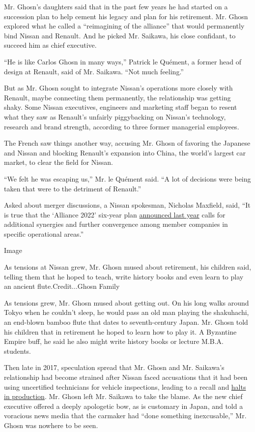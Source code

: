 Mr. Ghosn's daughters said that in the past few years he had started on
a succession plan to help cement his legacy and plan for his retirement.
Mr. Ghosn explored what he called a ``reimagining of the alliance'' that
would permanently bind Nissan and Renault. And he picked Mr. Saikawa,
his close confidant, to succeed him as chief executive.

``He is like Carlos Ghosn in many ways,'' Patrick le Quément, a former
head of design at Renault, said of Mr. Saikawa. ``Not much feeling.''

But as Mr. Ghosn sought to integrate Nissan's operations more closely
with Renault, maybe connecting them permanently, the relationship was
getting shaky. Some Nissan executives, engineers and marketing staff
began to resent what they saw as Renault's unfairly piggybacking on
Nissan's technology, research and brand strength, according to three
former managerial employees.

The French saw things another way, accusing Mr. Ghosn of favoring the
Japanese and Nissan and blocking Renault's expansion into China, the
world's largest car market, to clear the field for Nissan.

``We felt he was escaping us,'' Mr. le Quément said. ``A lot of
decisions were being taken that were to the detriment of Renault.''

Asked about merger discussions, a Nissan spokesman, Nicholas Maxfield,
said, ``It is true that the `Alliance 2022' six-year plan
\href{https://www.alliance-2022.com/news/alliance-2022-announcement/}{announced
last year} calls for additional synergies and further convergence among
member companies in specific operational areas.''

Image

As tensions at Nissan grew, Mr. Ghosn mused about retirement, his
children said, telling them that he hoped to teach, write history books
and even learn to play an ancient flute.Credit...Ghosn Family

As tensions grew, Mr. Ghosn mused about getting out. On his long walks
around Tokyo when he couldn't sleep, he would pass an old man playing
the shakuhachi, an end-blown bamboo flute that dates to seventh-century
Japan. Mr. Ghosn told his children that in retirement he hoped to learn
how to play it. A Byzantine Empire buff, he said he also might write
history books or lecture M.B.A. students.

Then late in 2017, speculation spread that Mr. Ghosn and Mr. Saikawa's
relationship had become strained after Nissan faced accusations that it
had been using uncertified technicians for vehicle inspections, leading
to a recall and
\href{https://www.nytimes.com/2017/10/19/business/nissan-japan-suspends-production.html}{halts
in production}. Mr. Ghosn left Mr. Saikawa to take the blame. As the new
chief executive offered a deeply apologetic bow, as is customary in
Japan, and told a voracious news media that the carmaker had ``done
something inexcusable,'' Mr. Ghosn was nowhere to be seen.

